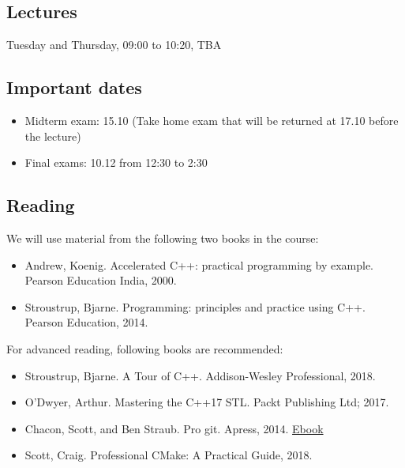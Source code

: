 \documentclass[11pt,letterpaper]{article}
\begin{document}
\subsection*{Lectures}
Tuesday and Thursday, 09:00 to 10:20, TBA
\subsection*{Important dates}
\begin{itemize}
\item Midterm exam: 15.10 (Take home exam that will be returned at 17.10 before the lecture)
\item Final exams: 10.12 from 12:30 to 2:30
\end{itemize}
\subsection*{Reading}

We will use material from the following two books in the course:

\begin{itemize}
\item Andrew, Koenig. Accelerated C++: practical programming by example. Pearson Education India, 2000.
\item Stroustrup, Bjarne. Programming: principles and practice using C++. Pearson Education, 2014.
\end{itemize}

For advanced reading, following books are recommended:

\begin{itemize}
\item Stroustrup, Bjarne. A Tour of C++. Addison-Wesley Professional, 2018.
\item O'Dwyer, Arthur. Mastering the C++17 STL. Packt Publishing Ltd; 2017.
\item Chacon, Scott, and Ben Straub. Pro git. Apress, 2014. \href{https://github.com/progit/progit2/releases/download/2.1.146/progit.pdf}{Ebook}
\item Scott, Craig. Professional CMake: A Practical Guide, 2018.
\end{itemize}
\end{document}
